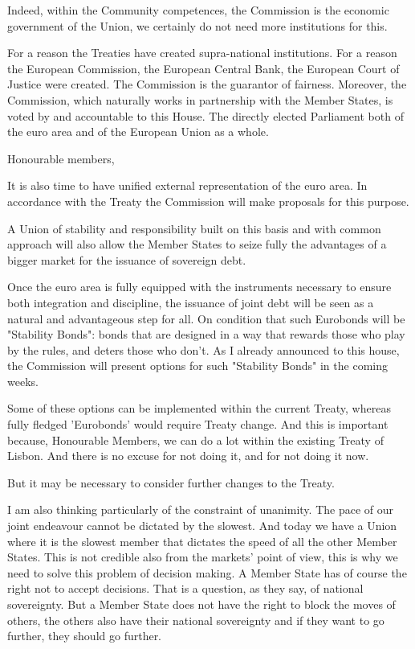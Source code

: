\documentclass[a4paper,11pt]{article}
\begin{document}
Indeed, within the Community competences, the Commission is the economic government of the Union, we certainly do not need more institutions for this.

For a reason the Treaties have created supra-national institutions. For a reason the European Commission, the European Central Bank, the European Court of Justice were created. The Commission is the guarantor of fairness. Moreover, the Commission, which naturally works in partnership with the Member States, is voted by and accountable to this House. The directly elected Parliament both of the euro area and of the European Union as a whole.

Honourable members,

It is also time to have unified external representation of the euro area. In accordance with the Treaty the Commission will make proposals for this purpose.

A Union of stability and responsibility built on this basis and with common approach will also allow the Member States to seize fully the advantages of a bigger market for the issuance of sovereign debt.

Once the euro area is fully equipped with the instruments necessary to ensure both integration and discipline, the issuance of joint debt will be seen as a natural and advantageous step for all. On condition that such Eurobonds will be "Stability Bonds": bonds that are designed in a way that rewards those who play by the rules, and deters those who don't. As I already announced to this house, the Commission will present options for such "Stability Bonds" in the coming weeks.

Some of these options can be implemented within the current Treaty, whereas fully fledged 'Eurobonds' would require Treaty change. And this is important because, Honourable Members, we can do a lot within the existing Treaty of Lisbon. And there is no excuse for not doing it, and for not doing it now.

But it may be necessary to consider further changes to the Treaty.

I am also thinking particularly of the constraint of unanimity. The pace of our joint endeavour cannot be dictated by the slowest. And today we have a Union where it is the slowest member that dictates the speed of all the other Member States. This is not credible also from the markets' point of view, this is why we need to solve this problem of decision making. A Member State has of course the right not to accept decisions. That is a question, as they say, of national sovereignty. But a Member State does not have the right to block the moves of others, the others also have their national sovereignty and if they want to go further, they should go further.
\end{document}
